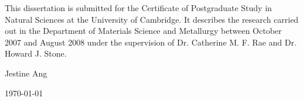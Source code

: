 \documentclass[11pt]{report}
\date{\today}
\begin{document}


\textmd{This dissertation is submitted for the Certificate of Postgraduate Study in Natural Sciences at the University of Cambridge. It describes the research carried out in the Department of Materials Science and Metallurgy between October 2007 and August 2008 under the supervision of Dr. Catherine M. F. Rae and Dr. Howard J. Stone.}

\vspace{1in}
\begin{flushright}
Jestine Ang

\today
\end{flushright}
\tableofcontents






\end{document}
